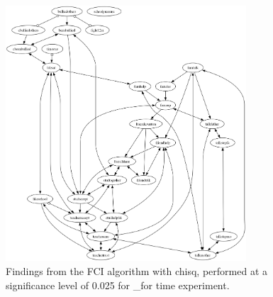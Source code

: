 \begin{figure}[htbp]
    \centering
    \includegraphics[width=0.8\textwidth]{Report/final_report/pictures/FCI_chisq_0.025__for time experiment.png}
    \caption{Findings from the FCI algorithm with chisq, performed at a significance level of 0.025 for _for time experiment.}
    \label{fig:fci_chisq_0.025_for time experiment}
\end{figure}
